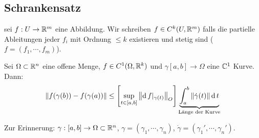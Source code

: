\subsection{Schrankensatz}

\begin{Def} sei $f:U\rightarrow\mathbb{R}^m$ eine Abbildung. Wir schreiben
  $f\in C^k(U,\mathbb{R}^m)$ falls die partielle Ableitungen jeder $f_i$ mit Ordnung $\leq k$ existieren und stetig sind ($f=(f_1,\cdots,f_m)$). 
\end{Def}

\begin{Sat}
  Sei $\Omega\subset\mathbb{R}^n$ eine offene Menge, $f\in C^1 (\Omega, \mathbb{R}^k)$
und $\gamma [a,b]\to\Omega$ eine $\mathbb{C}^1$ Kurve.
Dann:
  \[\left\| f(\gamma(b))-f(\gamma(a)) \right\|\leq \left[ \sup_{t\in [a,b]}\left\| \operatorname{d} f|_{\gamma(t)} \right\|_O \right]\underbrace{\int_a^b\left\| \dot \gamma(t) \right\|\operatorname{d} t}_{\text{Länge der Kurve}}\]
\end{Sat}
Zur Erinnerung:  $\gamma:[a,b]\rightarrow\Omega\subset\mathbb{R}^n$, $\gamma=(\gamma_1,\cdots,\gamma_n)$, $\dot\gamma=(\gamma_1',\cdots,\gamma_n')$.
